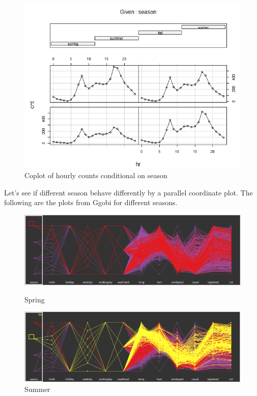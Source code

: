 \documentclass[12pt]{article}
\begin{document}
		\begin{figure}[H]
			\centering
			\includegraphics[scale=.9]{figures/coplot_season.png}
			\caption{Coplot of hourly counts conditional on season}
		\end{figure}
	
	 Let's see if different season behave differently by a parallel coordinate plot. The following are the plots from Ggobi for different seasons.
	 
	 \begin{figure}[H]
	 	\centering
	 	\begin{minipage}{.5\textwidth}
	 		\centering
	 		\includegraphics[width=\linewidth]{figures/spring_pcor.png}
	 		\caption{Spring}
	 	\end{minipage}%
	 	\begin{minipage}{.5\textwidth}
	 		\centering
	 		\includegraphics[width=\linewidth]{figures/summer_pcor.png}
	 		\caption{Summer}
	 	\end{minipage}
	 \end{figure}
	 
\end{document}
